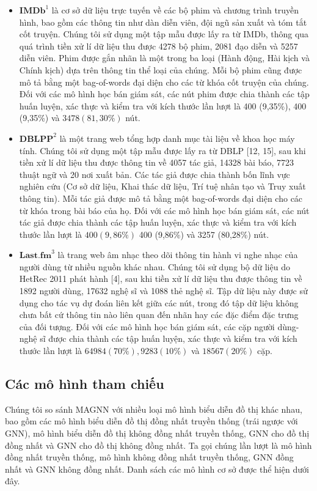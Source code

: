 \begin{itemize}
  \item $\mathbf{IMDb}^{1}$ là cơ sở dữ liệu trực tuyến về các bộ phim và chương trình truyền hình, bao gồm các thông tin như dàn diễn viên, đội ngũ sản xuất và tóm tắt cốt truyện. Chúng tôi sử dụng một tập mẫu được lấy ra từ IMDb, thông qua quá trình tiền xử lí dữ liệu thu được 4278 bộ phim, 2081 đạo diễn và 5257 diễn viên. Phim được gắn nhãn là một trong ba loại (Hành động, Hài kịch và Chính kịch) dựa trên thông tin thể loại của chúng. Mỗi bộ phim cũng được mô tả bằng một bag-of-words đại diện cho các từ khóa cốt truyện của chúng. Đối với các mô hình học bán giám sát, các nút phim được chia thành các tập huấn luyện, xác thực và kiểm tra với kích thước lần lượt là 400 (9,35\%), 400 (9,35\%) và $3478(81,30 \%)$ nút.
  \item $\mathbf{DBLPP}^{2}$ là một trang web tổng hợp danh mục tài liệu về khoa học máy tính. Chúng tôi sử dụng một tập mẫu được lấy ra từ DBLP [12, 15], sau khi tiền xử lí dữ liệu thu được thông tin về 4057 tác giả, 14328 bài báo, 7723 thuật ngữ và 20 nơi xuất bản. Các tác giả được chia thành bốn lĩnh vực nghiên cứu (Cơ sở dữ liệu, Khai thác dữ liệu, Trí tuệ nhân tạo và Truy xuất thông tin). Mỗi tác giả được mô tả bằng một bag-of-words đại diện cho các từ khóa trong bài báo của họ. Đối với các mô hình học bán giám sát, các nút tác giả được chia thành các tập huấn luyện, xác thực và kiểm tra với kích thước lần lượt là $400(9,86 \%)$ 400 (9,86\%) và 3257 (80,28\%) nút.
  \item $\mathbf{Last.fm}^{3}$ là trang web âm nhạc theo dõi thông tin hành vi nghe nhạc của người dùng từ nhiều nguồn khác nhau. Chúng tôi sử dụng bộ dữ liệu do HetRec 2011 phát hành [4], sau khi tiền xử lí dữ liệu thu được thông tin về 1892 người dùng, 17632 nghệ sĩ và 1088 thẻ nghệ sĩ. Tập dữ liệu này được sử dụng cho tác vụ dự đoán liên kết giữa các nút, trong đó tập dữ liệu không chưa bất cứ thông tin nào liên quan đến nhãn hay các đặc điểm đặc trưng của đối tượng. Đối với các mô hình học bán giám sát, các cặp người dùng-nghệ sĩ được chia thành các tập huấn luyện, xác thực và kiểm tra với kích thước lần lượt là $64984(70 \%), 9283(10 \%)$ và $18567(20 \%)$ cặp.
\end{itemize}

\subsection{Các mô hình tham chiếu}
Chúng tôi so sánh MAGNN với nhiều loại mô hình biểu diễn đồ thị khác nhau, bao gồm các mô hình biểu diễn đồ thị đồng nhất truyền thống (trái ngược với GNN), mô hình biểu diễn đồ thị không đồng nhất truyền thống, GNN cho đồ thị đồng nhất và GNN cho đồ thị không đồng nhất. Ta gọi chúng lần lượt là mô hình đồng nhất truyền thống, mô hình không đồng nhất truyền thống, GNN đồng nhất và GNN không đồng nhất. Danh sách các mô hình cơ sở được thể hiện dưới đây.

